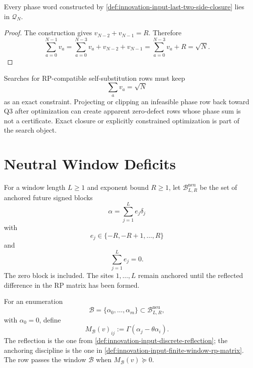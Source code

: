 \begin{theorem}
\label{thm:innovation-input-exact-qthree-closure}
Every phase word constructed by
\autoref{def:innovation-input-last-two-side-closure} lies in
$\mathcal Q_N$.
\end{theorem}

\begin{proof}
The construction gives $v_{N-2}+v_{N-1}=R$. Therefore
$$
\sum_{a=0}^{N-1}v_a
=
\sum_{a=0}^{N-3}v_a+v_{N-2}+v_{N-1}
=
\sum_{a=0}^{N-3}v_a+R
=
\sqrt N.
$$
\end{proof}

\begin{principle}
\label{prin:innovation-input-no-qthree-clip-projection}
Searches for RP-compatible self-substitution rows must keep
$$
\sum_a v_a=\sqrt N
$$
as an exact constraint. Projecting or clipping an infeasible phase row back
toward Q3 after optimization can create apparent zero-defect rows whose
phase sum is not a certificate. Exact closure or explicitly constrained
optimization is part of the search object.
\end{principle}

\section{Neutral Window Deficits}
\label{sec:innovation-input-neutral-window-deficits}

\begin{definition}
\label{def:innovation-input-neutral-future-block-set}
For a window length $L\ge1$ and exponent bound $R\ge1$, let
$\mathcal B_{L,R}^{\mathrm{neu}}$ be the set of anchored future signed
blocks
$$
\alpha=\sum_{j=1}^L e_j\delta_j
$$
with
$$
e_j\in\{-R,-R+1,\ldots,R\}
$$
and
$$
\sum_{j=1}^L e_j=0.
$$
The zero block is included. The sites $1,\ldots,L$ remain anchored until
the reflected difference in the RP matrix has been formed.
\end{definition}

\begin{definition}
\label{def:innovation-input-neutral-finite-window-rp-matrix}
For an enumeration
$$
\mathcal B=\{\alpha_0,\ldots,\alpha_m\}
\subset
\mathcal B_{L,R}^{\mathrm{neu}},
$$
with $\alpha_0=0$, define
$$
M_{\mathcal B}(v)_{ij}
:=
\Gamma(\alpha_j-\theta\alpha_i).
$$
The reflection is the one from
\autoref{def:innovation-input-discrete-reflection}; the anchoring
discipline is the one in
\autoref{def:innovation-input-finite-window-rp-matrix}. The row passes
the window $\mathcal B$ when $M_{\mathcal B}(v)\succeq0$.
\end{definition}

